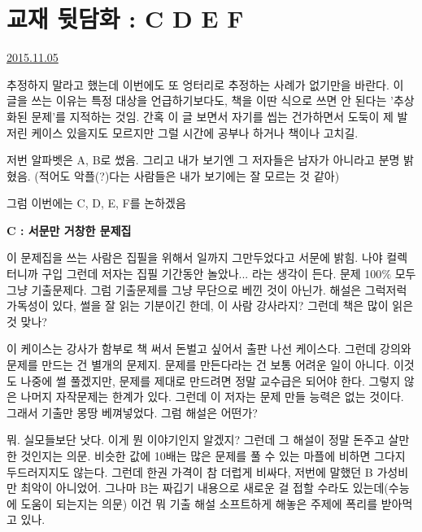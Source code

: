 
\section{교재 뒷담화 : C D E F}
\href{https://www.kockoc.com/Apoc/465559}{2015.11.05}

\vspace{5mm}

추정하지 말라고 했는데 이번에도 또 엉터리로 추정하는 사례가 없기만을 바란다.
이 글을 쓰는 이유는 특정 대상을 언급하기보다도, 책을 이딴 식으로 쓰면 안 된다는 '추상화된 문제'를 지적하는 것임.
간혹 이 글 보면서 자기를 씹는 건가하면서 도둑이 제 발 저린 케이스 있을지도 모르지만 그럴 시간에 공부나 하거나 책이나 고치길.
\vspace{5mm}

저번 알파벳은 A, B로 썼음. 그리고 내가 보기엔 그 저자들은 남자가 아니라고 분명 밝혔음.
(적어도 악플(?)다는 사람들은 내가 보기에는 잘 모르는 것 같아)
\vspace{5mm}

그럼 이번에는 C, D, E, F를 논하겠음
\vspace{5mm}

\textbf{C : 서문만 거창한 문제집}
\vspace{5mm}

이 문제집을 쓰는 사람은 집필을 위해서 일까지 그만두었다고 서문에 밝힘. 나야 컬렉터니까 구입
그런데 저자는 집필 기간동안 놀았나... 라는 생각이 든다.
문제 100$\%$ 모두 그냥 기출문제다. 그럼 기출문제를 그냥 무단으로 베낀 것이 아닌가.
해설은 그럭저럭 가독성이 있다, 썰을 잘 읽는 기분이긴 한데, 이 사람 강사라지? 그런데 책은 많이 읽은 것 맞나?
\vspace{5mm}

이 케이스는 강사가 함부로 책 써서 돈벌고 싶어서 출판 나선 케이스다.
그런데 강의와 문제를 만드는 건 별개의 문제지. 문제를 만든다라는 건 보통 어려운 일이 아니다.
이것도 나중에 썰 풀겠지만, 문제를 제대로 만드려면 정말 교수급은 되어야 한다. 그렇지 않은 나머지 자작문제는 한계가 있다.
그런데 이 저자는 문제 만들 능력은 없는 것이다. 그래서 기출만 몽땅 베껴넣었다.
그럼 해설은 어떤가?
\vspace{5mm}

뭐. 실모들보단 낫다. 이게 뭔 이야기인지 알겠지? 그런데 그 해설이 정말 돈주고 살만한 것인지는 의문.
비슷한 값에 10배는 많은 문제를 풀 수 있는 마플에 비하면 그다지 두드러지지도 않는다.
그런데 한권 가격이 참 더럽게 비싸다, 저번에 말했던 B 가성비만 최악이 아니었어.
그나마 B는 짜깁기 내용으로 새로운 걸 접할 수라도 있는데(수능에 도움이 되는지는 의문)
이건 뭐 기출 해설 소프트하게 해놓은 주제에 폭리를 받아먹고 있나.
\vspace{5mm}

